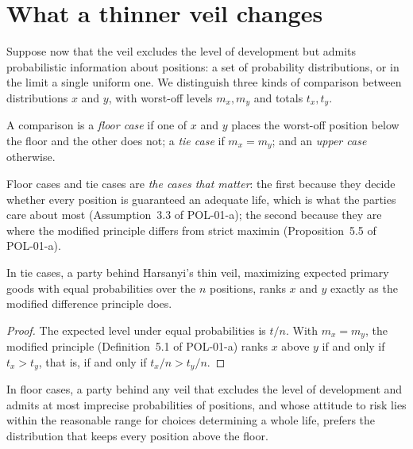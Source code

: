 \documentclass{situationist-preprint}
\begin{document}
\section{What a thinner veil changes}

Suppose now that the veil excludes the level of development but admits probabilistic information about positions: a set of probability distributions, or in the limit a single uniform one. We distinguish three kinds of comparison between distributions $x$ and $y$, with worst-off levels $m_x, m_y$ and totals $t_x, t_y$.

\begin{definition}\label{d:cases}
A comparison is a \emph{floor case} if one of $x$ and $y$ places the worst-off position below the floor and the other does not; a \emph{tie case} if $m_x = m_y$; and an \emph{upper case} otherwise.
\end{definition}

Floor cases and tie cases are \emph{the cases that matter}: the first because they decide whether every position is guaranteed an adequate life, which is what the parties care about most (Assumption~3.3 of POL-01-a); the second because they are where the modified principle differs from strict maximin (Proposition~5.5 of POL-01-a).

\begin{proposition}\label{p:tie}
In tie cases, a party behind Harsanyi's thin veil, maximizing expected primary goods with equal probabilities over the $n$ positions, ranks $x$ and $y$ exactly as the modified difference principle does.
\end{proposition}

\begin{proof}
The expected level under equal probabilities is $t/n$. With $m_x = m_y$, the modified principle (Definition~5.1 of POL-01-a) ranks $x$ above $y$ if and only if $t_x > t_y$, that is, if and only if $t_x/n > t_y/n$.
\end{proof}

\begin{proposition}\label{p:floor}
In floor cases, a party behind any veil that excludes the level of development and admits at most imprecise probabilities of positions, and whose attitude to risk lies within the reasonable range for choices determining a whole life, prefers the distribution that keeps every position above the floor.
\end{proposition}
\end{document}
